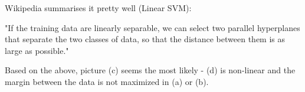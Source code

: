 \documentclass[article,11pt]{article}
\begin{document}
	\begin{figure}[ht!]
		\begin{center}
		\end{center}
	\end{figure}

\flushleft
Wikipedia summarises it pretty well (Linear SVM):

"If the training data are linearly separable, we can select two parallel hyperplanes that separate the two classes of data, so that the distance between them is as large as possible."\newline

Based on the above, picture (c) seems the most likely - (d) is non-linear and the margin between the data is not maximized in (a) or (b).
\end{document}
